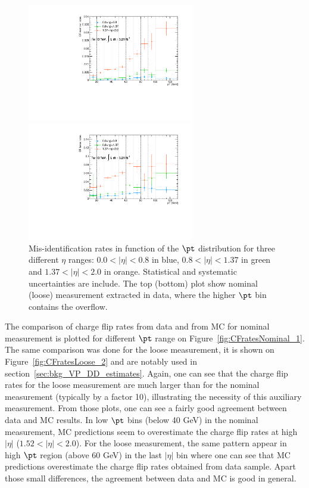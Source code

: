 \begin{figure}[!htb]
\centering
\includegraphics[width=0.65\textwidth]{FIGURES/BKG/chargeFlip/CFratesVSpt_data15.pdf}

\includegraphics[width=0.65\textwidth]{FIGURES/BKG/chargeFlip/CFratesVSpt_LOOSE_data15.pdf}
\caption{\label{fig:CFvsPt} Mis-identification rates in function of the $\pt$ distribution for three different $\eta$ ranges: $0.0<|\eta|<0.8$ in blue, $0.8<|\eta|<1.37$ in green and $1.37<|\eta|<2.0$ in orange. Statistical and systematic uncertainties are include. The top (bottom) plot show nominal (loose) measurement extracted in data, where the higher $\pt$ bin contains the overflow.}
\end{figure}


The comparison of charge flip rates from data and from MC for nominal measurement is plotted for different $\pt$ range on Figure~\ref{fig:CFratesNominal_1}. The same comparison was done for the loose measurement, it is shown on Figure~\ref{fig:CFratesLoose_2} and are notably used in section~\ref{sec:bkg_VP_DD_estimates}. Again, one can see that the charge flip rates for the loose measurement are much larger than for the nominal measurement (typically by a factor 10), illustrating the necessity of this auxiliary measurement. From those plots, one can see a fairly good agreement between data and MC results. In low $\pt$ bins (below 40 GeV) in the nominal measurement, MC predictions seem to overestimate the charge flip rates at high $|\eta|$ ($1.52<|\eta|<2.0$). For the loose measurement, the same pattern appear in high $\pt$ region (above 60 GeV) in the last $|\eta|$ bin where one can see that MC predictions overestimate the charge flip rates obtained from data sample. Apart those small differences, the agreement between data and MC is good in general.


